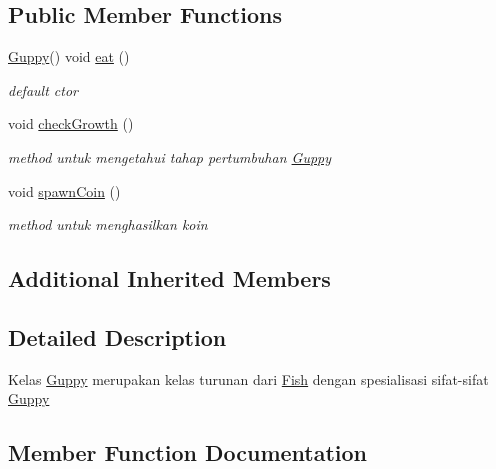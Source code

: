 \subsection*{Public Member Functions}
\begin{DoxyCompactItemize}
\item 
\hyperlink{classGuppy}{Guppy}() void \hyperlink{classGuppy_afe934262a0988e4ad041f4ed3a1a7e02}{eat} ()
\begin{DoxyCompactList}\small\item\em default ctor \end{DoxyCompactList}\item 
\mbox{\label{classGuppy_a06ceefb07ac8f6d590f8343c93c1edd9}} 
void \hyperlink{classGuppy_a06ceefb07ac8f6d590f8343c93c1edd9}{check\+Growth} ()
\begin{DoxyCompactList}\small\item\em method untuk mengetahui tahap pertumbuhan \hyperlink{classGuppy}{Guppy} \end{DoxyCompactList}\item 
\mbox{\label{classGuppy_a58d97b8704a2635e7b7a1b365c37c570}} 
void \hyperlink{classGuppy_a58d97b8704a2635e7b7a1b365c37c570}{spawn\+Coin} ()
\begin{DoxyCompactList}\small\item\em method untuk menghasilkan koin \end{DoxyCompactList}\end{DoxyCompactItemize}
\subsection*{Additional Inherited Members}


\subsection{Detailed Description}
Kelas \hyperlink{classGuppy}{Guppy} merupakan kelas turunan dari \hyperlink{classFish}{Fish} dengan spesialisasi sifat-\/sifat \hyperlink{classGuppy}{Guppy} 

\subsection{Member Function Documentation}
\mbox{\label{classGuppy_afe934262a0988e4ad041f4ed3a1a7e02}} 
